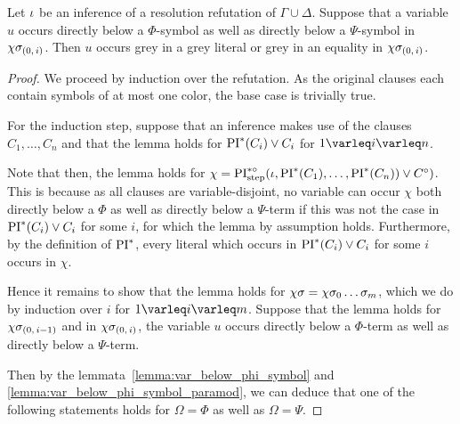 \documentclass[,%
	draft=false,%
	numbers=noendperiod
	12pt,
	a4paper,
	oneside,%
	openany,
]{memoir}
\newcommand{\inv}{\ensuremath{\chi}}
\begin{document}
\begin{clemma}
	Let $\iota$ be an inference of a resolution refutation of $\Gamma \cup \Delta$.
	Suppose that a variable $u$ occurs directly below a $\Phi$-symbol as well as directly below a $\Psi$-symbol in $\inv\sigmazi$.
	Then $u$ occurs grey in a grey literal or grey in an equality in $\inv\sigmazi$.
\end{clemma}
\begin{proof}
	We proceed by induction over the refutation.
	As the original clauses each contain symbols of at most one color, the base case is trivially true.

	For the induction step, suppose that an inference makes use of the clauses $C_1, \dots, C_n$ and that the lemma holds for $\operatorname{PI}^*(C_i) \lor C_i$ for $1\varleq i \varleq n$. 

	Note that then, the lemma holds for $\inv = \PIstepstarnosigma(\inference, \PI^*(C_1), \dots, \PI^*(C_n)) \lor C\nosigma)$.
	This is because as all clauses are variable-disjoint, no variable can occur $\inv$ both directly below a $\Phi$ as well as directly below a $\Psi$-term if this was not the case in $\operatorname{PI}^*(C_i) \lor C_i$ for some $i$, for which the lemma by assumption holds.
	Furthermore, by the definition of $\operatorname{PI}^*$, every literal which occurs in $\operatorname{PI}^*(C_i) \lor C_i$ for some $i$ occurs in $\inv$.

	Hence it remains to show that the lemma holds for $\inv\sigma = \inv\sigma_0\quantifierdots\sigma_m$, which we do by induction over $i$ for $1\varleq i \varleq m$.
	Suppose that the lemma holds for $\inv\sigmazmi$ and in $\inv\sigmazi$, the variable $u$ occurs directly below a $\Phi$-term as well as directly below a $\Psi$-term.

	Then by the lemmata~\ref{lemma:var_below_phi_symbol} and \ref{lemma:var_below_phi_symbol_paramod}, we can deduce that one of the following statements holds for $\Omega = \Phi$ as well as $\Omega = \Psi$.

\end{proof}
\end{document}
